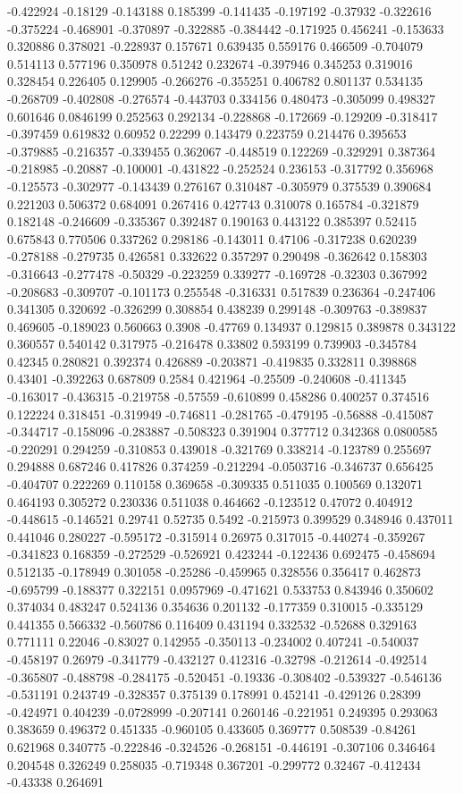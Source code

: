 -0.422924 -0.18129 -0.143188 0.185399 -0.141435 -0.197192 -0.37932 -0.322616 -0.375224 -0.468901 -0.370897 -0.322885 -0.384442 -0.171925 0.456241 -0.153633 0.320886 0.378021 -0.228937 0.157671 0.639435 0.559176 0.466509 -0.704079 0.514113 0.577196 0.350978 0.51242 0.232674 -0.397946 0.345253 0.319016 0.328454 0.226405 0.129905 -0.266276 -0.355251 0.406782 0.801137 0.534135 -0.268709 -0.402808 -0.276574 -0.443703 0.334156 0.480473 -0.305099 0.498327 0.601646 0.0846199 0.252563 0.292134 -0.228868 -0.172669 -0.129209 -0.318417 -0.397459 0.619832 0.60952 0.22299 0.143479 0.223759 0.214476 0.395653 -0.379885 -0.216357 -0.339455 0.362067 -0.448519 0.122269 -0.329291 0.387364 -0.218985 -0.20887 -0.100001 -0.431822 -0.252524 0.236153 -0.317792 0.356968 -0.125573 -0.302977 -0.143439 0.276167 0.310487 -0.305979 0.375539 0.390684 0.221203 0.506372 0.684091 0.267416 0.427743 0.310078 0.165784 -0.321879 0.182148 -0.246609 -0.335367 0.392487 0.190163 0.443122 0.385397 0.52415 0.675843 0.770506 0.337262 0.298186 -0.143011 0.47106 -0.317238 0.620239 -0.278188 -0.279735 0.426581 0.332622 0.357297 0.290498 -0.362642 0.158303 -0.316643 -0.277478 -0.50329 -0.223259 0.339277 -0.169728 -0.32303 0.367992 -0.208683 -0.309707 -0.101173 0.255548 -0.316331 0.517839 0.236364 -0.247406 0.341305 0.320692 -0.326299 0.308854 0.438239 0.299148 -0.309763 -0.389837 0.469605 -0.189023 0.560663 0.3908 -0.47769 0.134937 0.129815 0.389878 0.343122 0.360557 0.540142 0.317975 -0.216478 0.33802 0.593199 0.739903 -0.345784 0.42345 0.280821 0.392374 0.426889 -0.203871 -0.419835 0.332811 0.398868 0.43401 -0.392263 0.687809 0.2584 0.421964 -0.25509 -0.240608 -0.411345 -0.163017 -0.436315 -0.219758 -0.57559 -0.610899 0.458286 0.400257 0.374516 0.122224 0.318451 -0.319949 -0.746811 -0.281765 -0.479195 -0.56888 -0.415087 -0.344717 -0.158096 -0.283887 -0.508323 0.391904 0.377712 0.342368 0.0800585 -0.220291 0.294259 -0.310853 0.439018 -0.321769 0.338214 -0.123789 0.255697 0.294888 0.687246 0.417826 0.374259 -0.212294 -0.0503716 -0.346737 0.656425 -0.404707 0.222269 0.110158 0.369658 -0.309335 0.511035 0.100569 0.132071 0.464193 0.305272 0.230336 0.511038 0.464662 -0.123512 0.47072 0.404912 -0.448615 -0.146521 0.29741 0.52735 0.5492 -0.215973 0.399529 0.348946 0.437011 0.441046 0.280227 -0.595172 -0.315914 0.26975 0.317015 -0.440274 -0.359267 -0.341823 0.168359 -0.272529 -0.526921 0.423244 -0.122436 0.692475 -0.458694 0.512135 -0.178949 0.301058 -0.25286 -0.459965 0.328556 0.356417 0.462873 -0.695799 -0.188377 0.322151 0.0957969 -0.471621 0.533753 0.843946 0.350602 0.374034 0.483247 0.524136 0.354636 0.201132 -0.177359 0.310015 -0.335129 0.441355 0.566332 -0.560786 0.116409 0.431194 0.332532 -0.52688 0.329163 0.771111 0.22046 -0.83027 0.142955 -0.350113 -0.234002 0.407241 -0.540037 -0.458197 0.26979 -0.341779 -0.432127 0.412316 -0.32798 -0.212614 -0.492514 -0.365807 -0.488798 -0.284175 -0.520451 -0.19336 -0.308402 -0.539327 -0.546136 -0.531191 0.243749 -0.328357 0.375139 0.178991 0.452141 -0.429126 0.28399 -0.424971 0.404239 -0.0728999 -0.207141 0.260146 -0.221951 0.249395 0.293063 0.383659 0.496372 0.451335 -0.960105 0.433605 0.369777 0.508539 -0.84261 0.621968 0.340775 -0.222846 -0.324526 -0.268151 -0.446191 -0.307106 0.346464 0.204548 0.326249 0.258035 -0.719348 0.367201 -0.299772 0.32467 -0.412434 -0.43338 0.264691 